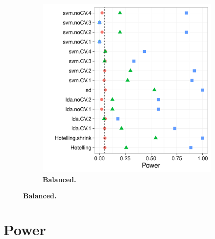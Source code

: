 \documentclass[12pt,a4paper]{article}
\begin{document}
\begin{figure}[h]
\begin{subfigure}{.5\textwidth}
\includegraphics[width=1\linewidth]{"art/2016-07-27 11:42:05"}
\caption{\textbf{Balanced.}} 
\label{fig:simulation_12}
\end{subfigure}
\end{figure}




\section{Power}
\label{sec:power}
\end{document}
